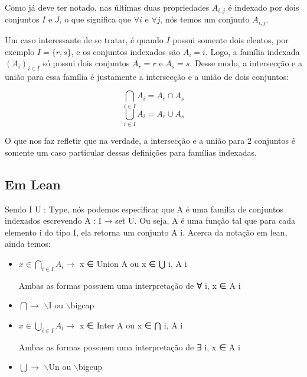 Como já deve ter notado, nas últimas duas propriedades $A_{i,j}$ é indexado por dois conjuntos $I$ e $J$, o que significa que $\forall i$ e $\forall j$, nós temos um conjunto $A_{i,j}$.

Um caso interessante de se tratar, é quando $I$ possui somente dois elentos, por exemplo $I=\{r,s\}$, e os conjuntos indexados são $A_i={i}$. Logo, a família indexada $(A_i)_{i \in I}$ só possui dois conjuntos $A_r={r}$ e $A_s={s}$. Desse modo, a intersecção e a união para essa família é justamente a intersecção e a união de dois conjuntos:

\[\bigcap_{i \in I} A_i = A_r \cap A_s\]
\[\bigcup_{i \in I} A_i = A_r \cup A_s\]

O que nos faz refletir que na verdade, a intersecção e a união para $2$ conjuntos é somente um caso particular dessas definições para famílias indexadas.

\subsection{Em Lean}
Sendo {\selectfont I U : Type}, nós podemos especificar que {\selectfont A} é uma família de conjuntos indexados escrevendo {\selectfont A : I → set U}. Ou seja, {\selectfont A} é uma função tal que para cada elemento {\selectfont i} do tipo {\selectfont I}, ela retorna um conjunto {\selectfont A i}. Acerca da notação em lean, ainda temos:

\begin{itemize}
  \item $x \in \bigcap_{i \in I} A_i \rightarrow$ {\selectfont x ∈ Union A} ou {\selectfont x ∈ ⋃ i, A i}
  
  Ambas as formas possuem uma interpretação de {\selectfont ∀ i, x ∈ A i}

  \item $\bigcap \rightarrow$ {\selectfont $\backslash$I} ou {\selectfont $\backslash$bigcap}
  \item $x \in \bigcup_{i \in I} A_i \rightarrow$ {\selectfont x ∈ Inter A} ou {\selectfont x ∈ ⋂ i, A i}
  
  Ambas as formas possuem uma interpretação de {\selectfont ∃ i, x ∈ A i}

  \item $\bigcup \rightarrow$ {\selectfont $\backslash$Un} ou {\selectfont $\backslash$bigcup}
\end{itemize}

